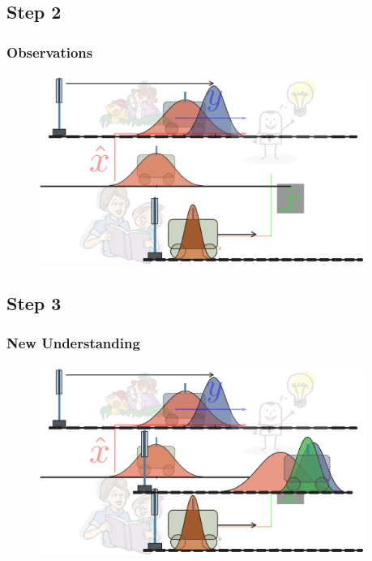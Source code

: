 \subsection{Step 2}
\begin{frame}\pw\Large
\frametitle{Observations}
\framesubtitle{}
\begin{figure}
\includegraphics[width=0.95\textwidth]{figs/WFAR11_UCP_Update_Prediction_Process-2.pdf}
\end{figure}
\end{frame}


\subsection{Step 3}
\begin{frame}\pw\Large
\frametitle{New Understanding}
\framesubtitle{}
\begin{figure}
\includegraphics[width=0.95\textwidth]{figs/WFAR11_UCP_Update_Prediction_Process-3.pdf}
\end{figure}
\end{frame}


